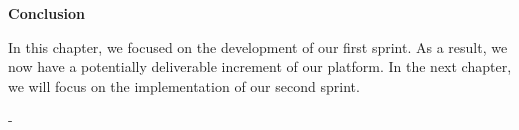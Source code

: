 \newpage
\begin{center}
    \doublespacing  %
    \centering
    \LARGE\textbf{Conclusion} 
    \vspace{1cm} \\
    \raggedright
\end{center}
In this chapter, we focused on the development of our first sprint. As a result, we now have a potentially deliverable increment of our platform.
In the next chapter, we will focus on the implementation of our second sprint.













 -








